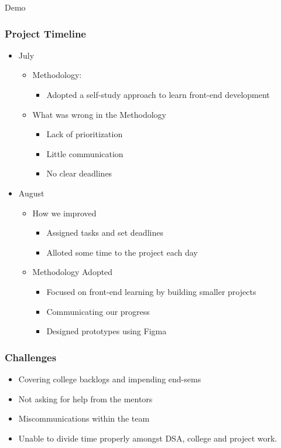 \documentclass{beamer}
\begin{document}
\begin{frame}
    \center\Huge Demo
\end{frame}

\begin{frame}
\frametitle{Project Timeline}
\begin{itemize}
  \item July
  \begin{itemize}
    \item Methodology:
    \begin{itemize}
      \item Adopted a self-study approach to learn front-end development 
    \end{itemize}
    \item What was wrong in the Methodology
    \begin{itemize}
      \item Lack of prioritization
      \item Little communication
      \item No clear deadlines
    \end{itemize}
  \end{itemize}
  \item August
  \begin{itemize}
    \item How we improved
    \begin{itemize}
      \item Assigned tasks and set deadlines
      \item Alloted some time to the project each day
    \end{itemize}
    \item Methodology Adopted
    \begin{itemize}
      \item Focused on front-end learning by building smaller projects
      \item Communicating our progress
      \item Designed prototypes using Figma
    \end{itemize}
  \end{itemize}

\end{itemize}
\end{frame}

\begin{frame}
  \frametitle{Challenges}
  \begin{itemize}
    \item Covering college backlogs and impending end-sems
    \item Not asking for help from the mentors
    \item Miscommunications within the team
    \item Unable to divide time properly amongst DSA, college and project work.
  \end{itemize}
  \end{frame}
\end{document}
